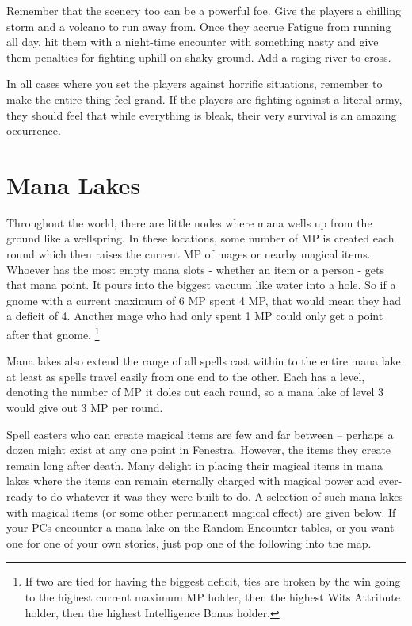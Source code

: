 Remember that the scenery too can be a powerful foe.  Give the players a chilling storm and a volcano to run away from.  Once they accrue Fatigue from running all day, hit them with a night-time encounter with something nasty and give them penalties for fighting uphill on shaky ground.  Add a raging river to cross.

In all cases where you set the players against horrific situations, remember to make the entire thing feel grand.  If the players are fighting against a literal army, they should feel that while everything is bleak, their very survival is an amazing occurrence.

\section{Mana Lakes}\label{mana_lake}

Throughout the world, there are little nodes where mana wells up from the ground like a wellspring.  In these locations, some number of MP is created each round which then raises the current MP of mages or nearby magical items.  Whoever has the most empty mana slots - whether an item or a person - gets that mana point.  It pours into the biggest vacuum like water into a hole.  So if a gnome with a current maximum of 6 MP spent 4 MP, that would mean they had a deficit of 4.  Another mage who had only spent 1 MP could only get a point after that gnome. 
\footnote{If two are tied for having the biggest deficit, ties are broken by the win going to the highest current maximum MP holder, then the highest Wits Attribute holder, then the highest Intelligence Bonus holder.}

Mana lakes also extend the range of all spells cast within to the entire mana lake at least as spells travel easily from one end to the other.  Each has a level, denoting the number of MP it doles out each round, so a mana lake of level 3 would give out 3 MP per round.

Spell casters who can create magical items are few and far between -- perhaps a dozen might exist at any one point in Fenestra.  However, the items they create remain long after death.  Many delight in placing their magical items in mana lakes where the items can remain eternally charged with magical power and ever-ready to do whatever it was they were built to do.  A selection of such mana lakes with magical items (or some other permanent magical effect) are given below.  If your PCs encounter a mana lake on the Random Encounter tables, or you want one for one of your own stories, just pop one of the following into the map.

